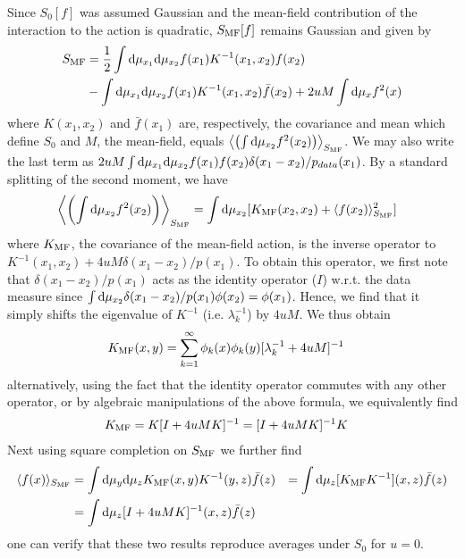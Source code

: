 Since $S_0[f]$ was assumed Gaussian and the mean-field contribution of the interaction to the action is quadratic, $S_{\text{MF}}[f]$ remains Gaussian and given by 
\begin{align}
S_{\text{MF}} &= \frac{1}{2} \int \text{d}\mu_{x_1} \text{d}\mu_{x_2} f(x_1) K^{-1}(x_1,x_2) f(x_2) \\ \nonumber 
&- \int \text{d}\mu_{x_1} \text{d}\mu_{x_2} f(x_1) K^{-1}(x_1,x_2) \bar{f}(x_2) + 2u M \int \text{d}\mu_x f^2(x) 
\end{align}
where $K(x_1,x_2)$ and $\bar{f}(x_1)$ are, respectively, the covariance and mean which define $S_0$ and $M$, the mean-field, equals $\left\langle \left(\int \text{d}\mu_{x_2} f^2(x_2)\right) \right\rangle_{S_{\text{MF}}}$. We may also write the last term as $2u M \int \text{d}\mu_{x_1} \text{d}\mu_{x_2} f(x_1) f(x_2) \delta(x_1-x_2)/p_{data}(x_1)$. By a standard splitting of the second moment, we have 
\begin{align}
\label{Eq:MF_1}
&\left\langle \left(\int \text{d}\mu_{x_2} f^2(x_2)\right) \right\rangle_{S_{\text{MF}}} = \int \text{d}\mu_{x_2}  [K_{\text{MF}}(x_2,x_2)+ \langle f(x_2) \rangle_{S_{\text{MF}}}^2] 
\end{align}
where $K_{\text{MF}}$, the covariance of the mean-field action, is the inverse operator to $K^{-1}(x_1,x_2)+4 u M \delta(x_1-x_2)/p(x_1)$. To obtain this operator, we first note that $\delta(x_1-x_2)/p(x_1)$ acts as the identity operator ($I$) w.r.t. the data measure since $\int \text{d}\mu_{x_2} \delta(x_1-x_2)/p(x_1) \phi(x_2)=\phi(x_1)$. Hence, we find that it simply shifts the eigenvalue of $K^{-1}$ (i.e. $\lambda_k^{-1}$) by $4uM$. We thus obtain 
\begin{align}
\label{Eq:KMF_Spectral}
K_{\text{MF}}(x,y) &= \sum_{k=1}^{\infty} \phi_k(x) \phi_k(y) [\lambda_k^{-1}+4uM]^{-1}
\end{align}
alternatively, using the fact that the identity operator commutes with any other operator, or by algebraic manipulations of the above formula, we equivalently find 
\begin{align}
K_{\text{MF}} &= K [I+4 uM K]^{-1} = [I+4 uM K]^{-1} K
\end{align}
Next using square completion on $S_{\text{MF}}$ we further find 
\begin{align}
\langle f(x) \rangle_{S_{\text{MF}}} &= \int \text{d}\mu_y \text{d}\mu_z K_{\text{MF}}(x,y) K^{-1}(y,z) \bar{f}(z) 
&= \int \text{d}\mu_z [K_{\text{MF}}K^{-1}](x,z) \bar{f}(z) \\ \nonumber 
&= \int \text{d}\mu_z [I+4uMK]^{-1}(x,z) \bar{f}(z)
\end{align}
one can verify that these two results reproduce averages under $S_0$ for $u=0$. 

